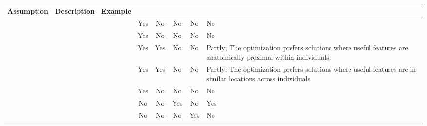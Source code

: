 {\footnotesize \begin{tabular}{L{.15\textwidth} L{.20\textwidth} L{.20\textwidth} c c c c L{.20\textwidth}}
\toprule
Assumption & Description & Example &  &  &   &   &   \\
\midrule
{} &  &  & Yes& No & No & No & No \\
 &  &  & Yes& No & No & No & No \\
 &  &  & Yes& Yes& No & No & Partly; The optimization prefers solutions where useful features are anatomically proximal within individuals. \\
 &  &  & Yes& Yes& No & No & Partly; The optimization prefers solutions where useful features are in similar locations across individuals. \\
 &  &  & Yes& No & No & No & No \\
 &  &  & No & No & Yes& No & Yes\\
 &  &  & No & No & No & Yes& No \\
\bottomrule
\end{tabular}}


